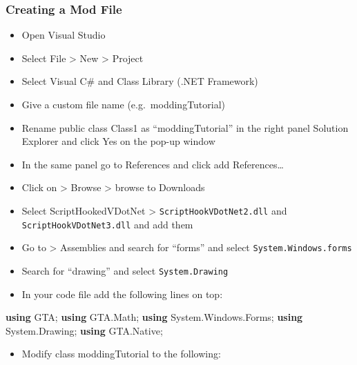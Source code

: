 \documentclass[
  openany]{book}
\newenvironment{Shaded}{\begin{snugshade}}{\end{snugshade}}
\newcommand{\FunctionTok}[1]{\textcolor[rgb]{0.00,0.00,0.00}{#1}}
\newcommand{\KeywordTok}[1]{\textcolor[rgb]{0.13,0.29,0.53}{\textbf{#1}}}
\newcommand{\NormalTok}[1]{#1}
\providecommand{\tightlist}{%
  \setlength{\itemsep}{0pt}\setlength{\parskip}{0pt}}
\begin{document}
\hypertarget{creating-a-mod-file}{%
\subsubsection*{Creating a Mod File}\label{creating-a-mod-file}}

\begin{itemize}
\item
  Open Visual Studio
\item
  Select File \textgreater{} New \textgreater{} Project
\item
  Select Visual C\# and Class Library (.NET Framework)
\item
  Give a custom file name (e.g.~moddingTutorial)
\item
  Rename public class Class1 as ``moddingTutorial'' in the right panel Solution Explorer and click Yes on the pop-up window
\item
  In the same panel go to References and click add References\ldots{}
\item
  Click on \textgreater{} Browse \textgreater{} browse to Downloads
\item
  Select ScriptHookedVDotNet \textgreater{} \texttt{ScriptHookVDotNet2.dll} and \texttt{ScriptHookVDotNet3.dll} and add them
\item
  Go to \textgreater{} Assemblies and search for ``forms'' and select \texttt{System.Windows.forms}
\item
  Search for ``drawing'' and select \texttt{System.Drawing}
\item
  In your code file add the following lines on top:
\end{itemize}

\begin{Shaded}
\begin{Highlighting}[]
\KeywordTok{using}\NormalTok{ GTA;}
\KeywordTok{using}\NormalTok{ GTA.}\FunctionTok{Math}\NormalTok{;}
\KeywordTok{using}\NormalTok{ System.}\FunctionTok{Windows}\NormalTok{.}\FunctionTok{Forms}\NormalTok{;}
\KeywordTok{using}\NormalTok{ System.}\FunctionTok{Drawing}\NormalTok{;}
\KeywordTok{using}\NormalTok{ GTA.}\FunctionTok{Native}\NormalTok{;}
\end{Highlighting}
\end{Shaded}

\begin{itemize}
\tightlist
\item
  Modify class moddingTutorial to the following:
\end{itemize}
\end{document}
